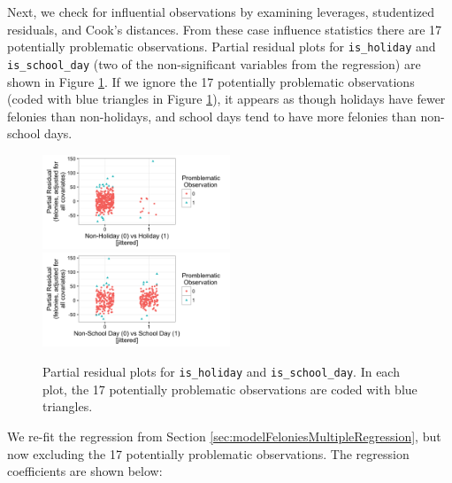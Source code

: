 \documentclass[11pt,notitlepage]{article}
\begin{document}
Next, we check for influential observations by examining leverages, studentized residuals, and Cook's distances. From these case influence statistics there are 17 potentially problematic observations. Partial residual plots for \texttt{is_holiday} and \texttt{is_school_day} (two of the non-significant variables from the regression) are shown in Figure \ref{fig:lm4Pres}. If we ignore the 17 potentially problematic observations (coded with blue triangles in Figure \ref{fig:lm4Pres}), it appears as though holidays have fewer felonies than non-holidays, and school days tend to have more felonies than non-school days.

\begin{figure}[!h]
  \centering
  \captionsetup{width=0.8\textwidth}
  \subfloat%
  		{\includegraphics[width=0.5\textwidth]
  		{figures/lm4PresIsHoliday.png}\label{fig:lm4PresIsHoliday}}
  \hfill
  \subfloat%
  		{\includegraphics[width=0.5\textwidth]
  		{figures/lm4PresIsSchoolDay.png}\label{fig:lm4PresIsSchoolDay}}
  \caption{Partial residual plots for \texttt{is_holiday} and \texttt{is_school_day}. In each plot, the 17 potentially problematic observations are coded with blue triangles.}
  \label{fig:lm4Pres}
\end{figure}




We re-fit the regression from Section \ref{sec:modelFeloniesMultipleRegression}, but now excluding the 17 potentially problematic observations. The regression coefficients are shown below:
\end{document}
